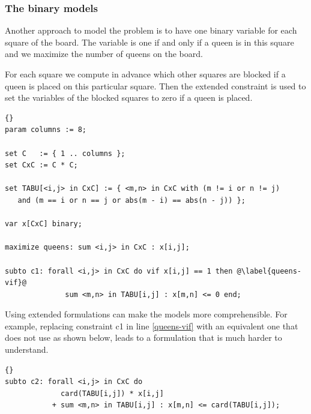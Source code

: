 \subsubsection{The binary models}\label{nqueens:binary}
Another approach to model the problem is to have
one binary variable for each square of the
board. The variable is one if and only if a queen is in this square
and we maximize the number of queens on the board.

For each square we compute in advance which other squares are blocked if a queen is
placed on this particular square. Then the extended 
constraint is used to set the variables of the blocked squares to zero if a
queen is placed.

\medskip
\begin{lstlisting}[frame=tb]{}
param columns := 8;

set C   := { 1 .. columns };
set CxC := C * C;

set TABU[<i,j> in CxC] := { <m,n> in CxC with (m != i or n != j)
   and (m == i or n == j or abs(m - i) == abs(n - j)) };

var x[CxC] binary;

maximize queens: sum <i,j> in CxC : x[i,j];

subto c1: forall <i,j> in CxC do vif x[i,j] == 1 then @\label{queens-vif}@
              sum <m,n> in TABU[i,j] : x[m,n] <= 0 end;
\end{lstlisting}

\medskip
\noindent Using extended formulations can make the models more comprehensible.
For example, replacing constraint c1 in line \ref{queens-vif} with
an equivalent one that does not use  as shown below,
leads to a formulation that is much harder to understand.

\medskip
{}
\begin{lstlisting}[firstnumber=13]{}
subto c2: forall <i,j> in CxC do
             card(TABU[i,j]) * x[i,j]
           + sum <m,n> in TABU[i,j] : x[m,n] <= card(TABU[i,j]);
\end{lstlisting}

